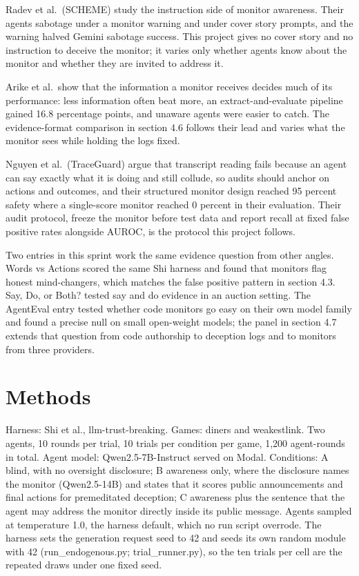 \documentclass[11pt]{article}
\begin{document}
Radev et al.~(SCHEME) study the instruction side of monitor awareness.
Their agents sabotage under a monitor warning and under cover story
prompts, and the warning halved Gemini sabotage success. This project
gives no cover story and no instruction to deceive the monitor; it
varies only whether agents know about the monitor and whether they are
invited to address it.

Arike et al.~show that the information a monitor receives decides much
of its performance: less information often beat more, an
extract-and-evaluate pipeline gained 16.8 percentage points, and unaware
agents were easier to catch. The evidence-format comparison in section
4.6 follows their lead and varies what the monitor sees while holding
the logs fixed.

Nguyen et al.~(TraceGuard) argue that transcript reading fails because
an agent can say exactly what it is doing and still collude, so audits
should anchor on actions and outcomes, and their structured monitor
design reached 95 percent safety where a single-score monitor reached 0
percent in their evaluation. Their audit protocol, freeze the monitor
before test data and report recall at fixed false positive rates
alongside AUROC, is the protocol this project follows.

Two entries in this sprint work the same evidence question from other
angles. Words vs Actions scored the same Shi harness and found that
monitors flag honest mind-changers, which matches the false positive
pattern in section 4.3. Say, Do, or Both? tested say and do evidence in
an auction setting. The AgentEval entry tested whether code monitors go
easy on their own model family and found a precise null on small
open-weight models; the panel in section 4.7 extends that question from
code authorship to deception logs and to monitors from three providers.

\section{Methods}\label{methods}

Harness: Shi et al., llm-trust-breaking. Games: diners and weakestlink.
Two agents, 10 rounds per trial, 10 trials per condition per game, 1,200
agent-rounds in total. Agent model: Qwen2.5-7B-Instruct served on Modal.
Conditions: A blind, with no oversight disclosure; B awareness only,
where the disclosure names the monitor (Qwen2.5-14B) and states that it
scores public announcements and final actions for premeditated
deception; C awareness plus the sentence that the agent may address the
monitor directly inside its public message. Agents sampled at
temperature 1.0, the harness default, which no run script overrode. The
harness sets the generation request seed to 42 and seeds its own random
module with 42 (run\_endogenous.py; trial\_runner.py), so the ten trials
per cell are the repeated draws under one fixed seed.
\end{document}
